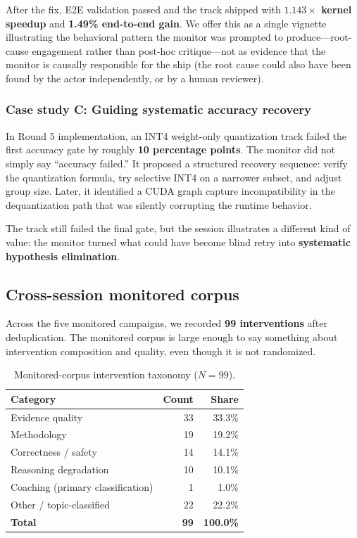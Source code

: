 \documentclass[11pt]{article}
\begin{document}
After the fix, E2E validation passed and the track shipped with \textbf{$1.143\times$ kernel speedup} and \textbf{1.49\% end-to-end gain}. We offer this as a single vignette illustrating the behavioral pattern the monitor was prompted to produce---root-cause engagement rather than post-hoc critique---not as evidence that the monitor is causally responsible for the ship (the root cause could also have been found by the actor independently, or by a human reviewer).

\subsubsection{Case study C: Guiding systematic accuracy recovery}

In Round 5 implementation, an INT4 weight-only quantization track failed the first accuracy gate by roughly \textbf{10 percentage points}. The monitor did not simply say ``accuracy failed.'' It proposed a structured recovery sequence: verify the quantization formula, try selective INT4 on a narrower subset, and adjust group size. Later, it identified a CUDA graph capture incompatibility in the dequantization path that was silently corrupting the runtime behavior.

The track still failed the final gate, but the session illustrates a different kind of value: the monitor turned what could have become blind retry into \textbf{systematic hypothesis elimination}.

\subsection{Cross-session monitored corpus}

Across the five monitored campaigns, we recorded \textbf{99 interventions} after deduplication. The monitored corpus is large enough to say something about intervention composition and quality, even though it is not randomized.

\begin{table}[h]
\centering
\caption{Monitored-corpus intervention taxonomy ($N=99$).}
\label{tab:tax}
\small
\begin{tabular}{@{}lrr@{}}
\toprule
\textbf{Category} & \textbf{Count} & \textbf{Share} \\
\midrule
Evidence quality & 33 & 33.3\% \\
Methodology & 19 & 19.2\% \\
Correctness / safety & 14 & 14.1\% \\
Reasoning degradation & 10 & 10.1\% \\
Coaching (primary classification) & 1 & 1.0\% \\
Other / topic-classified & 22 & 22.2\% \\
\midrule
\textbf{Total} & \textbf{99} & \textbf{100.0\%} \\
\bottomrule
\end{tabular}
\end{table}
\end{document}

